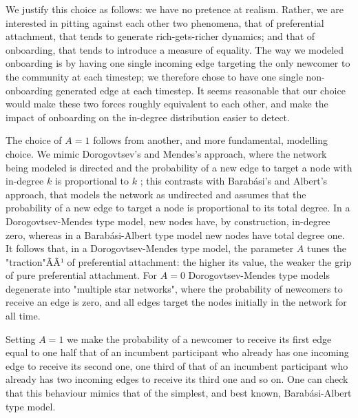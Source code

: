 \documentclass{article}
\begin{document}
We justify this choice as follows: we have no pretence at realism. Rather, we are interested in pitting against each other two phenomena, that of preferential attachment, that tends to generate rich-gets-richer dynamics; and that of onboarding, that tends to introduce a measure of equality. The way we modeled onboarding is by having one single incoming edge targeting the only newcomer to the community at each timestep; we therefore chose to have one single non-onboarding generated edge at each timestep. It seems reasonable that our choice would make  these two forces roughly equivalent to each other, and make the impact of onboarding on the in-degree distribution easier to detect. 


The choice of $A=1$ follows from another, and more fundamental, modelling choice. We mimic Dorogovtsev's and Mendes's approach, where the network being modeled is directed and the probability of a new edge to target a node with in-degree $k$ is proportional to $k$ \cite{dorogovtsev2002evolution}; this contrasts with Barab\'asi's and Albert's approach, that models the network as undirected and assumes that the probability of a new edge to target a node is proportional to its total degree. In a Dorogovtsev-Mendes type model, new nodes have, by construction, in-degree zero, whereas in a Barab\'asi-Albert type model new nodes have total degree one. It follows that, in a Dorogovtsev-Mendes type model, the parameter $A$ tunes the "traction"ÃÃ¹ of preferential attachment: the higher its value, the weaker the grip of pure preferential attachment. For $A=0$ Dorogovtsev-Mendes type models degenerate into "multiple star networks", where the probability of newcomers to receive an edge is zero, and all edges target the nodes initially in the network for all time. 

Setting $A = 1$ we make the probability of a newcomer to receive its first edge equal to one half that of an incumbent participant who already has one incoming edge to receive its second one, one third of that of an incumbent participant who already has two incoming edges to receive its third one and so on. One can check that this behaviour mimics that of the simplest, and best known, Barab\'asi-Albert type model. 





\label{lastpage}
\end{document}
